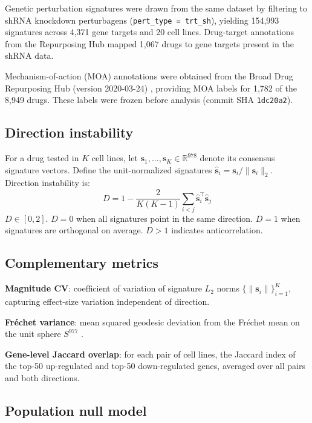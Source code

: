 \documentclass{article}
\begin{document}
Genetic perturbation signatures were drawn from the same dataset by
filtering to shRNA knockdown perturbagens (\texttt{pert\_type = trt\_sh}),
yielding 154{,}993 signatures across 4{,}371 gene targets and 20 cell lines.
Drug-target annotations from the Repurposing Hub mapped 1{,}067 drugs to
gene targets present in the shRNA data.

Mechanism-of-action (MOA) annotations were obtained from the Broad Drug
Repurposing Hub (version 2020-03-24) \citep{corsello2017drug}, providing
MOA labels for 1{,}782 of the 8{,}949 drugs. These labels were frozen
before analysis (commit SHA \texttt{1dc20a2}).

\subsection{Direction instability}

For a drug tested in $K$ cell lines, let $\mathbf{s}_1, \ldots,
\mathbf{s}_K \in \mathbb{R}^{978}$ denote its consensus signature vectors.
Define the unit-normalized signatures $\hat{\mathbf{s}}_i =
\mathbf{s}_i / \|\mathbf{s}_i\|_2$. Direction instability is:
\begin{equation}
  D = 1 - \frac{2}{K(K-1)} \sum_{i < j}
    \hat{\mathbf{s}}_i^\top \hat{\mathbf{s}}_j
  \label{eq:direction_instability}
\end{equation}
$D \in [0, 2]$. $D = 0$ when all signatures point in the same direction.
$D = 1$ when signatures are orthogonal on average. $D > 1$ indicates
anticorrelation.

\subsection{Complementary metrics}

\textbf{Magnitude CV}: coefficient of variation of signature $L_2$ norms
$\{\|\mathbf{s}_i\|\}_{i=1}^K$, capturing effect-size variation independent
of direction.

\textbf{Fr\'echet variance}: mean squared geodesic deviation from the
Fr\'echet mean on the unit sphere $S^{977}$
\citep{pennec2006intrinsic}.

\textbf{Gene-level Jaccard overlap}: for each pair of cell lines, the
Jaccard index of the top-50 up-regulated and top-50 down-regulated genes,
averaged over all pairs and both directions.

\subsection{Population null model}
\end{document}
